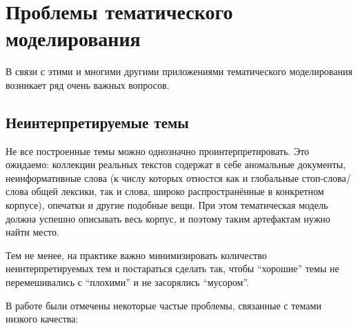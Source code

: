 
\section{Проблемы тематического моделирования}

В связи с этими и многими другими приложениями тематического моделирования возникает ряд очень важных вопросов.

\subsection{Неинтерпретируемые темы}

Не все построенные темы можно однозначно проинтерпретировать. Это ожидаемо: коллекции реальных текстов содержат в себе аномальные документы, неинформативные слова (к числу которых отностся как и глобальные стоп-слова/слова общей лексики, так и слова, широко распространённые в конкретном корпусе), опечатки и другие подобные вещи. При этом тематическая модель должна успешно описывать весь корпус, и поэтому таким артефактам нужно найти место.

Тем не менее, на практике важно минимизировать количество неинтерпретируемых тем и постараться сделать так, чтобы ``хорошие'' темы не перемешивались с ``плохими'' и не засорялись ``мусором''.


В работе \cite{mimno} были отмечены некоторые частые проблемы, связанные с темами низкого качества:

